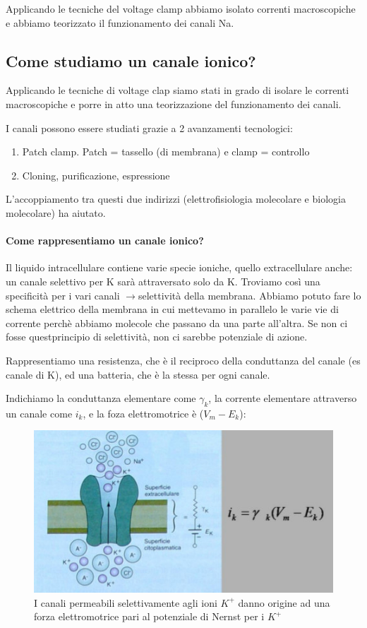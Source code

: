 \documentclass[a4paper,12pt]{article}
\newcommand{\lfreccia}{\ensuremath{\longrightarrow}}
\begin{document}
Applicando le tecniche del voltage clamp abbiamo isolato correnti macroscopiche e abbiamo teorizzato il funzionamento dei canali Na. 

\subsection{Come studiamo un canale ionico?}
Applicando le tecniche di voltage clap siamo stati in grado di isolare le correnti macroscopiche e porre in atto una teorizzazione del funzionamento dei canali.

I canali possono essere studiati grazie a 2 avanzamenti tecnologici:
\begin{enumerate}
\item{Patch clamp. Patch = tassello (di membrana) e clamp = controllo}
\item{Cloning, purificazione, espressione}
\end{enumerate}
L'accoppiamento tra questi due indirizzi (elettrofisiologia molecolare e biologia molecolare) ha aiutato.

\paragraph{Come rappresentiamo un canale ionico?}
Il liquido intracellulare contiene varie specie ioniche, quello extracellulare anche: un canale selettivo per K sarà attraversato solo da K. Troviamo così una specificità per i vari canali \lfreccia selettività della membrana. Abbiamo potuto fare lo schema elettrico della membrana in cui mettevamo in parallelo le varie vie di corrente perchè abbiamo molecole che passano da una parte all'altra. Se non ci fosse questprincipio di selettività, non ci sarebbe potenziale di azione.

Rappresentiamo una resistenza, che è il reciproco della conduttanza del canale (es canale di K), ed una batteria, che è la stessa per ogni canale.

Indichiamo la conduttanza elementare come $\gamma_{k}$, la corrente elementare attraverso un canale come $i_{k}$, e la foza elettromotrice è ($V_{m} - E_{k}$):
\begin{figure}[H]
\centering
\includegraphics[scale=0.4]{immagine/potassio1.jpg}
\caption{I canali permeabili selettivamente agli ioni $K^{+}$ danno origine ad una forza elettromotrice pari al potenziale di Nernst per i $K^{+}$}
\end{figure}
 
\end{document}

